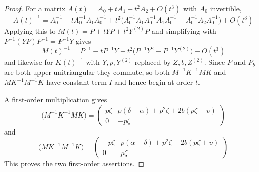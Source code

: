 \documentclass[10pt,a4paper]{amsart}
\begin{document}
\begin{proof}
For a matrix $A(t) = A_0 + tA_1 + t^2A_2 + O(t^3)$ with $A_0$ invertible,
\begin{equation*}
	A(t)^{-1} = A_0^{-1} - tA_0^{-1}A_1A_0^{-1} + t^2\bigl(A_0^{-1}A_1A_0^{-1}A_1A_0^{-1} - A_0^{-1}A_2A_0^{-1}\bigr) + O(t^3)
\end{equation*}
Applying this to $M(t) = P + tYP + t^2Y^{(2)}P$ and simplifying with $P^{-1}(YP)P^{-1} = P^{-1}Y$ gives
\begin{equation*}
	M(t)^{-1} = P^{-1} - tP^{-1}Y + t^2\bigl(P^{-1}Y^2 - P^{-1}Y^{(2)}\bigr) + O(t^3)
\end{equation*}
and likewise for $K(t)^{-1}$ with $Y, p, Y^{(2)}$ replaced by $Z, b, Z^{(2)}$. Since $P$ and $P_b$ are both upper unitriangular they commute, so both $M^{-1}K^{-1}MK$ and $MK^{-1}M^{-1}K$ have constant term $I$ and hence begin at order $t$.
	
\medskip
	
A first-order multiplication gives
\begin{equation*}
	[t]\bigl(M^{-1}K^{-1}MK\bigr) = \begin{pmatrix}p\zeta & p(\delta-\alpha)+p^2\zeta+2b(p\zeta+\upsilon)\\ 0&-p\zeta \end{pmatrix}
\end{equation*}
and
\begin{equation*}
	[t]\bigl(MK^{-1}M^{-1}K\bigr) = \begin{pmatrix} -p\zeta & p(\alpha-\delta)+p^2\zeta-2b(p\zeta+\upsilon)\\ 0&p\zeta \end{pmatrix}
\end{equation*}
This proves the two first-order assertions.

\medskip


\end{proof}
\end{document}
